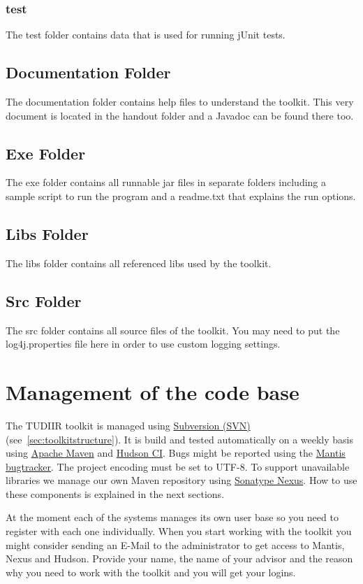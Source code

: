 \documentclass[a4paper,twoside]{article}      %
\begin{document}
\subsubsection{test}  
The test folder contains data that is used for running jUnit tests.

\subsection{Documentation Folder}
The documentation folder contains help files to understand the toolkit. This very document is located in the handout folder and a Javadoc can be found there too.

\subsection{Exe Folder}
The exe folder contains all runnable jar files in separate folders including a sample script to run the program and a readme.txt that explains the run options.

\subsection{Libs Folder}
The libs folder contains all referenced libs used by the toolkit.

\subsection{Src Folder}
The src folder contains all source files of the toolkit. You may need to put the log4j.properties file here in order to use custom logging settings.

\section{Management of the code base}
The TUDIIR toolkit is managed using \href{http://subversion.apache.org/}{Subversion (SVN)} (see~\ref{sec:toolkitstructure}). It is build and tested automatically on a weekly basis using \href{http://maven.apache.org/}{Apache Maven} and \href{http://hudson-ci.org/}{Hudson CI}. Bugs might be reported using the \href{http://www.mantisbt.org/}{Mantis bugtracker}. The project encoding must be set to UTF-8. To support unavailable libraries we manage our own Maven repository using \href{http://nexus.sonatype.org/}{Sonatype Nexus}. How to use these components is explained in the next sections.

At the moment each of the systems manages its own user base so you need to register with each one individually. When you start working with the toolkit you might consider sending an E-Mail to the administrator to get access to Mantis, Nexus and Hudson. Provide your name, the name of your advisor and the reason why you need to work with the toolkit and you will get your logins.
\end{document}

